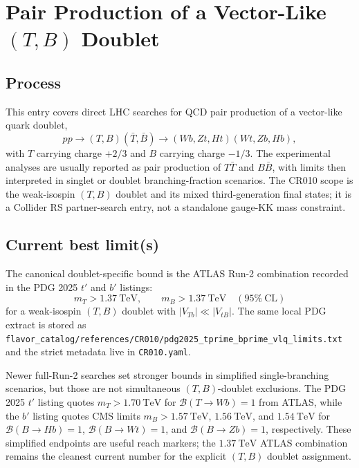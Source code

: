 
\section{\texorpdfstring{Pair Production of a Vector-Like \((T,B)\) Doublet}{Pair Production of a Vector-Like (T,B) Doublet}}

\subsection*{Process}
This entry covers direct LHC searches for QCD pair production of a
vector-like quark doublet,
\[
  pp \to (T,B)(\bar T,\bar B) \to
  (Wb,Zt,Ht)(Wt,Zb,Hb),
\]
with \(T\) carrying charge \(+2/3\) and \(B\) carrying charge \(-1/3\).
The experimental analyses are usually reported as pair production of
\(T\bar T\) and \(B\bar B\), with limits then interpreted in singlet or
doublet branching-fraction scenarios.  The CR010 scope is the weak-isospin
\((T,B)\) doublet and its mixed third-generation final states; it is a
Collider RS partner-search entry, not a standalone gauge-KK mass constraint.

\subsection*{Current best limit(s)}
The canonical doublet-specific bound is the ATLAS Run-2 combination recorded
in the PDG 2025 \(t'\) and \(b'\) listings:
\[
  m_T > 1.37~\mathrm{TeV}, \qquad
  m_B > 1.37~\mathrm{TeV}
  \quad (95\%~\mathrm{CL})
\]
for a weak-isospin \((T,B)\) doublet with \(|V_{Tb}|\ll |V_{tB}|\).  The
same local PDG extract is stored as
\texttt{flavor\_catalog/references/CR010/pdg2025\_tprime\_bprime\_vlq\_limits.txt}
and the strict metadata live in \texttt{CR010.yaml}.

Newer full-Run-2 searches set stronger bounds in simplified single-branching
scenarios, but those are not simultaneous \((T,B)\)-doublet exclusions.  The
PDG 2025 \(t'\) listing quotes \(m_T>1.70~\mathrm{TeV}\) for
\(\mathcal B(T\to Wb)=1\) from ATLAS, while the \(b'\) listing quotes CMS
limits \(m_B>1.57~\mathrm{TeV}\), \(1.56~\mathrm{TeV}\), and
\(1.54~\mathrm{TeV}\) for \(\mathcal B(B\to Hb)=1\),
\(\mathcal B(B\to Wt)=1\), and \(\mathcal B(B\to Zb)=1\), respectively.
These simplified endpoints are useful reach markers; the \(1.37~\mathrm{TeV}\)
ATLAS combination remains the cleanest current number for the explicit
\((T,B)\) doublet assignment.

